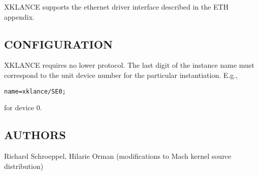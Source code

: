 XKLANCE supports the ethernet driver interface
described in the ETH appendix.


\subsection*{CONFIGURATION}

XKLANCE requires no lower protocol.  The last digit of the instance
name must correspond to the unit device number for the particular
instantiation.  E.g., 

\medskip

{\tt name=xklance/SE0;}

\medskip

\noindent for device 0.


\subsection*{AUTHORS}

\noindent Richard Schroeppel, Hilarie Orman (modifications to Mach
kernel source distribution)

